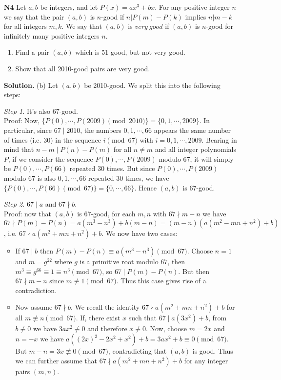 \documentclass[12pt]{article}
\newcommand{\<}{\langle}
\renewcommand{\>}{\rangle}
\begin{document}
\begin{enumerate}
	\item [\textbf{N4}]Let $a, b$ be integers, and let $P(x) = ax^3+bx.$ For any positive integer $n$ we say that the pair $(a,b)$ is $n$-good if $n | P(m)-P(k)$ implies $n | m - k$ for all integers $m, k.$ We say that $(a,b)$ is $very \ good$ if $(a,b)$ is $n$-good for infinitely many positive integers $n.$
	\begin{enumerate}
		\item Find a pair $(a,b)$ which is 51-good, but not very good.
		\item Show that all 2010-good pairs are very good.
		\end{enumerate}
	
	\textbf{Solution.} (b) Let $(a, b)$ be 2010-good. We split this into the following steps: 
	
	\emph{Step 1.} It's also 67-good. \\
	Proof: Now, $\{P(0), \cdots , P(2009) \pmod{2010}\}=\{0, 1, \cdots , 2009\}$. In particular, since $67\mid 2010$, the numbers $0, 1, \cdots , 66$ appears the same number of times (i.e. 30) in the sequence $i\pmod{67}$ with $i=0, 1, \cdots , 2009$. 
	Bearing in mind that $n-m\mid P(n)-P(m)$ for all $n\neq m$ and all integer polynomials $P$, if we consider the sequence $P(0), \cdots , P(2009)$ modulo 67, it will simply be $P(0), \cdots , P(66)$ repeated 30 times. But since $P(0), \cdots , P(2009)$ modulo 67 is also $0, 1, \cdots , 66$ repeated 30 times, we have $\{P(0), \cdots , P(66)\pmod{67}\}=\{0, \cdots, 66\}$. Hence $(a, b)$ is 67-good. 
	
	\emph{Step 2.} $67\mid a$ and $67\nmid b$. \\
	Proof: now that $(a, b)$ is 67-good, for each $m, n$ with $67\nmid m-n$ we have $67\nmid P(m)-P(n)=a(m^3-n^3)+b(m-n)=(m-n)(a(m^2-mn+n^2)+b)$, i.e. $67\nmid a(m^2+mn+n^2)+b$. We now have two cases: 
	\begin{itemize}
		\item If $67\mid b$ then $P(m)-P(n)\equiv a(m^3-n^3)\pmod{67}$. Choose $n=1$ and $m=g^{22}$ where $g$ is a primitive root modulo 67, then $m^3\equiv g^{66}\equiv 1\equiv n^3\pmod{67}$, so $67\mid P(m)-P(n)$. But then $67\nmid m-n$ since $m\not\equiv 1\pmod{67}$. Thus this case gives rise of a contradiction. 
		
		\item Now assume $67\nmid b$. We recall the identity $67\nmid a(m^2+mn+n^2)+b$ for all $m\not\equiv n\pmod{67}$. 
		If, there exist $x$ such that $67\mid a(3x^2)+b$, from $b\not\equiv 0$ we have $3ax^2\not\equiv 0$ and therefore $x\not\equiv 0$. 
		Now, choose $m=2x$ and $n=-x$ we have $a((2x)^2-2x^2+x^2)+b=3ax^2+b\equiv 0\pmod{67}$. 
		But $m-n=3x\not\equiv 0\pmod{67}$, contradicting that $(a, b)$ is good. 
		Thus we can further assume that $67\nmid a(m^2+mn+n^2)+b$ for any integer pairs $(m, n)$. 
		

\end{itemize}
\end{enumerate}
\end{document}

